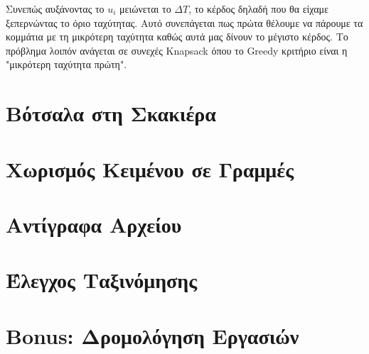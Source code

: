 \documentclass[a4paper,10pt]{article} \usepackage{anysize}
\begin{document}
Συνεπώς αυξάνοντας το $u_i$ μειώνεται το $\Delta{T}$, το κέρδος δηλαδή που θα
είχαμε ξεπερνώντας το όριο ταχύτητας. Αυτό συνεπάγεται πως πρώτα θέλουμε να
πάρουμε τα κομμάτια με τη μικρότερη ταχύτητα καθώς αυτά μας δίνουν το μέγιστο
κέρδος. Το πρόβλημα λοιπόν ανάγεται σε συνεχές Knapsack όπου το Greedy
κριτήριο είναι η "μικρότερη ταχύτητα πρώτη".





\vspace{3cm}

\section{Βότσαλα στη Σκακιέρα}


\vspace{3cm}

\section{Χωρισμός Κειμένου σε Γραμμές}


\vspace{3cm}

\section{Αντίγραφα Αρχείου}


\vspace{3cm}

\section{Έλεγχος Ταξινόμησης}


\vspace{3cm}

\section{Bonus: Δρομολόγηση Εργασιών}
\end{document}
